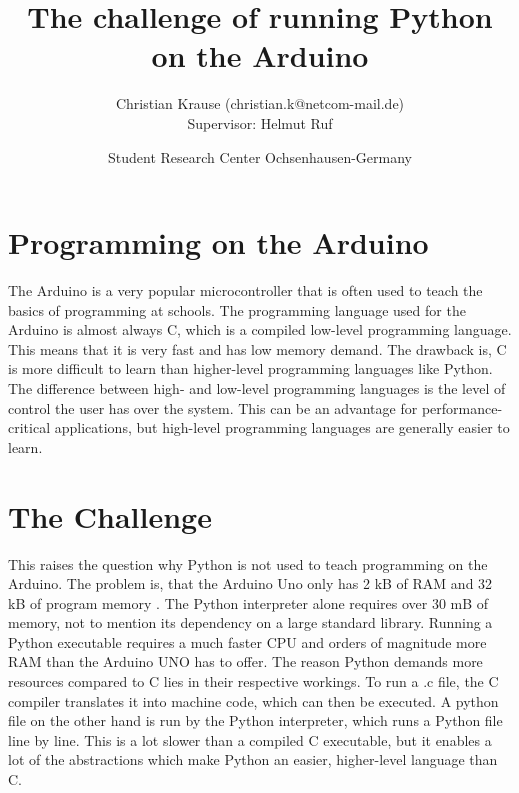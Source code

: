 \documentclass{article}
\title{The challenge of running Python on the Arduino}
\author{Christian Krause \small(christian.k@netcom-mail.de)\\[0.1cm]{\small Supervisor: Helmut Ruf}}
\date{\small Student Research Center Ochsenhausen-Germany}
\begin{document}
\maketitle
\begin{multicols}{2}
\section{Programming on the Arduino}
\noindent The Arduino is a very popular microcontroller that is often used to teach the basics of programming at schools. The programming language used for the Arduino is almost always C, which is a compiled low-level programming language. This means that it is very fast and has low memory demand. The drawback is, C is more difficult to learn than higher-level programming languages like Python. The difference between high- and low-level programming languages is the level of control the user has over the system. This can be an advantage for performance-critical applications, but high-level programming languages are generally easier to learn.%

\section{The Challenge}
\noindent This raises the question why Python is not used to teach programming on the Arduino. The problem is, that the Arduino Uno only has 2 kB of RAM and 32 kB of program memory \cite{Q1}. The Python interpreter alone requires over 30 mB of memory, not to mention its dependency on a large standard library. Running a Python executable requires a much faster CPU and orders of magnitude more RAM than the Arduino UNO has to offer. %
The reason Python demands more resources compared to C lies in their respective workings. To run a .c file, the C compiler translates it into machine code, which can then be executed. A python file on the other hand is run by the Python interpreter, which runs a Python file line by line. This is a lot slower than a compiled C executable, but it enables a lot of the abstractions which make Python an easier, higher-level language than C.


\end{multicols}
\end{document}
